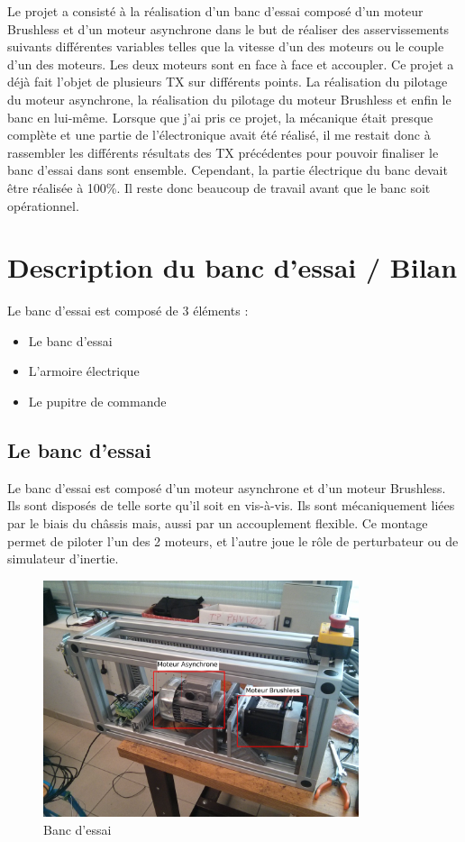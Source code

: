 \documentclass[11pt]{article}
\begin{document}
Le projet a consisté à la réalisation d'un banc d'essai composé d'un moteur Brushless et d'un moteur asynchrone dans le but de réaliser des asservissements suivants différentes variables telles que la vitesse d'un des moteurs ou le couple d'un des moteurs. Les deux moteurs sont en face à face et accoupler. Ce projet a déjà fait l'objet de plusieurs TX sur différents points. La réalisation du pilotage du moteur asynchrone, la réalisation du pilotage du moteur Brushless et enfin le banc en lui-même. Lorsque que j'ai pris ce projet, la mécanique était presque complète et une partie de l'électronique avait été réalisé, il me restait donc à rassembler les différents résultats des TX précédentes pour pouvoir finaliser le banc d'essai dans sont ensemble. Cependant, la partie électrique du banc devait être réalisée à 100\%. Il reste donc beaucoup de travail avant que le banc soit opérationnel.

\newpage

\section{Description du banc d'essai / Bilan}
Le banc d'essai est composé de 3 éléments :

\begin{itemize}
	\item Le banc d'essai
	\item L'armoire électrique
	\item Le pupitre de commande
\end{itemize}

\subsection{Le banc d'essai}

Le banc d'essai est composé d'un moteur asynchrone et d'un moteur Brushless. Ils sont disposés de telle sorte qu'il soit en vis-à-vis. Ils sont mécaniquement liées par le biais du châssis mais, aussi par un accouplement flexible. Ce montage permet de piloter l'un des 2 moteurs, et l'autre joue le rôle de perturbateur ou de simulateur d'inertie.

\begin{figure}[!h]
    \centering
    \includegraphics[width=350px]{banc_essai_desc.jpg}
    \caption{Banc d'essai}
\end{figure}
\end{document}
